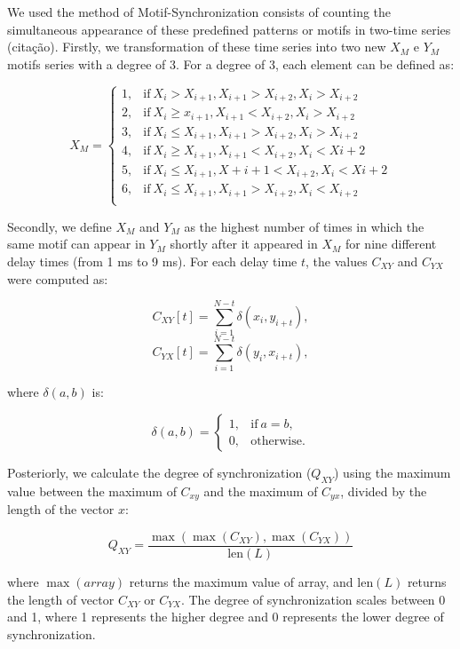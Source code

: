 \documentclass[man,a4paper,12pt,floatsintext]{apa6}
\begin{document}
We used the method of Motif-Synchronization consists of counting the simultaneous appearance of these predefined patterns or motifs in two-time series (citação). Firstly,  we transformation of these time series into two new $X_M$ e $Y_M$ motifs series with a degree of 3. For a degree of 3, each element can be defined as:

\[
X_M = \begin{cases}
  1, & \text{if}\ X_i > X_{i+1}, X_{i+1} > X_{i+2}, X_{i} > X_{i+2} \\
  2, & \text{if}\ X_i \geq x_{i+1}, X_{i+1} < X_{i+2}, X_{i} > X_{i+2} \\
  3, & \text{if}\ X_i \leq X_{i+1}, X_{i+1} > X_{i+2}, X_i > X_{i+2} \\
  4, & \text{if}\ X_i \geq X_{i+1}, X_{i+1} < X_{i+2}, X_{i} < X{i+2} \\
  5, & \text{if}\ X_i \leq X_{i+1}, X+{i+1} < X_{i+2}, X_i < X{i+2} \\
  6, & \text{if}\ X_i \leq X_{i+1}, X_{i+1} > X_{i+2}, X_i < X_{i+2}\\
\end{cases}
\]

Secondly, we define $X_M$ and $Y_M$ as the highest number of times in which the same motif can appear in $Y_M$ shortly after it appeared in $X_M$ for nine different delay times (from 1 ms to 9 ms). For each delay time $t$, the values $C_{XY}$ and $C_{YX}$ were computed as:

\[
C_{XY}[t] = \sum_{i=1}^{N-t} \delta(x_{i}, y_{i+t}),
\]
\[
C_{YX}[t] = \sum_{i=1}^{N-t} \delta(y_{i}, x_{i+t}),
\]

where $\delta(a, b)$ is:

\[
\delta(a, b) = \begin{cases}
1, & \text{if}\ a = b, \\
0, & \text{otherwise}.
\end{cases}
\]

Posteriorly, we calculate the degree of synchronization ($Q_{XY}$) using the maximum value between the maximum of $C_{xy}$ and the maximum of $C_{yx}$, divided by the length of the vector $x$:

\[
Q_{XY} = \frac{\max(\max(C_{XY}), \max(C_{YX}))}{\text{len}(L)}
\]

where $\max(array)$ returns the maximum value of array, and $\text{len}(L)$ returns the length of vector $C_{XY}$ or $C_{YX}$. The degree of synchronization scales between 0 and 1, where 1 represents the higher degree and 0 represents the lower degree of synchronization.
\end{document}
